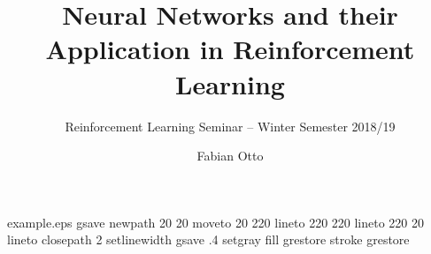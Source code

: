 %
%
%
%
%
\begin{filecontents*}{example.eps}
    gsave
    newpath
    20 20 moveto
    20 220 lineto
    220 220 lineto
    220 20 lineto
    closepath
    2 setlinewidth
    gsave
    .4 setgray fill
    grestore
    stroke
    grestore
\end{filecontents*}
%
\RequirePackage{fix-cm}
%
\documentclass{svjour3}                     %
%
\smartqed  %
%
\usepackage{graphicx}
%
%
%
%
%


    \title{Neural Networks and their Application in Reinforcement Learning%
    }
    \subtitle{Reinforcement Learning Seminar -- Winter Semester 2018/19}


    \author{Fabian Otto
    }


